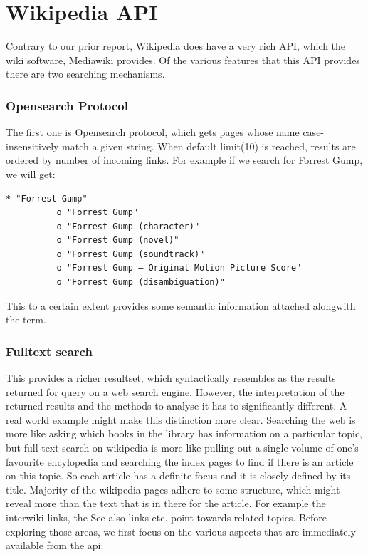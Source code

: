 \documentclass[11pt]{article}
\begin{document}
\section{Wikipedia API}

\label{March9to29}
Contrary to our prior report, Wikipedia does have a very rich API, which the wiki software, Mediawiki provides. Of the various features that this API provides there are two searching mechanisms. 

\subsubsection{Opensearch Protocol}
The first one is Opensearch protocol, which gets pages whose name case-insensitively match a given string. When default limit(10) is reached, results are ordered by number of incoming links. For example if we search for Forrest Gump, we will get:

\begin{lstlisting}[label=Opensearch Protocol, caption=Result using Opensearch]
    * "Forrest Gump"
          o "Forrest Gump"
          o "Forrest Gump (character)"
          o "Forrest Gump (novel)"
          o "Forrest Gump (soundtrack)"
          o "Forrest Gump – Original Motion Picture Score"
          o "Forrest Gump (disambiguation)"

\end{lstlisting}

This to a certain extent provides some semantic information attached alongwith the term.

\subsubsection{Fulltext search}
This provides a richer resultset, which syntactically resembles as the results returned for query on a web search engine. However, the interpretation of the returned results and the methods to analyse it has to significantly different. A real world example might make this distinction more clear. Searching the web is more like asking which books in the library has information on a particular topic, but full text search on wikipedia is more like pulling out a single volume of one's favourite encylopedia and searching the index pages to find if there is an article on this topic. So each article has a definite focus and it is closely defined by its title. Majority of the wikipedia pages adhere to some structure, which might reveal more than the text that is in there for the article. For example the interwiki links, the See also links etc. point towards related topics. Before exploring those areas, we first focus on the various aspects that are immediately available from the api:
\end{document}
